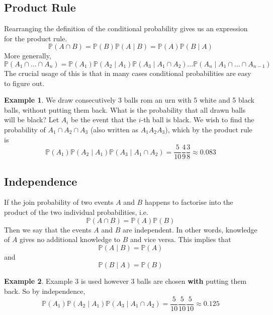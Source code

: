 \documentclass{report}
\theoremstyle{definition}
\newtheorem{example}{Example}
\theoremstyle{plain}
\theoremstyle{remark}
\begin{document}
\subsection{Product Rule}
Rearranging the definition of the conditional probability gives us an
expression for the product rule.
$$ \mathbb{P}(A\cap B) = \mathbb{P}(B) \mathbb{P}(A\mid B) = \mathbb{P}(A)
\mathbb{P}(B\mid A)$$
More generally,
$$ \mathbb{P}(A_1 \cap \dots \cap A_n) = \mathbb{P}(A_1) \mathbb{P}(A_2 \mid
A_1) \mathbb{P}(A_3\mid A_1 \cap A_2) \dots \mathbb{P}(A_n\mid A_1 \cap \dots
\cap A_{n-1}) $$
The crucial usage of this is that in many cases conditional probabilities are
easy to figure out.
\begin{example}
We draw consecutively 3 balls rom an urn with 5 white and 5 black balls,
without putting them back. What is the probability that all drawn balls will be
black? Let $ A_i $ be the event that the $ i $-th ball is black. We wish to
find the probability of $ A_1 \cap A_2 \cap A_3 $ (also written as $ A_1 A_2
A_3 $), which by the product rule is 
$$ \mathbb{P}(A_1) \mathbb{P}(A_2 \mid A_1) \mathbb{P}(A_3 \mid A_1 \cap A_2)
= \frac{5}{10} \frac{4}{9} \frac{3}{8} \approx 0.083 $$
\end{example}
\subsection{Independence}
If the join probability of two events $ A $ and $ B $ happens to factorise into
the product of the two individual probabilities, i.e.
$$ \mathbb{P}(A \cap B) = \mathbb{P}(A) \mathbb{P}(B) $$
Then we say that the events $ A $ and $ B $ are independent. In other words,
knowledge of $ A $ gives no additional knowledge to $ B $ and vice versa. This
implies that 
$$ \mathbb{P}(A\mid B) = \mathbb{P}(A) $$ 
and 
$$ \mathbb{P}(B\mid A) = \mathbb{P}(B) $$

\begin{example}
  Example 3 is used however 3 balls are chosen \textbf{with} putting them back.
  So by independence,
  $$ \mathbb{P}(A_1) \mathbb{P}(A_2 \mid A_1) \mathbb{P}(A_3 \mid A_1 \cap A_2)
  = \frac{5}{10} \frac{5}{10} \frac{5}{10} \approx 0.125$$
\end{example}
\end{document}
